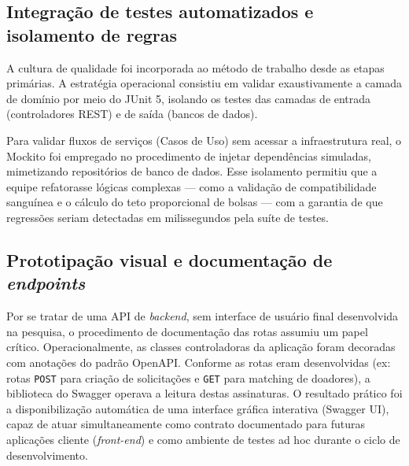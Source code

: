 \subsection{Integração de testes automatizados e isolamento de regras}

A cultura de qualidade foi incorporada ao método de trabalho desde as etapas primárias. A estratégia operacional consistiu em validar exaustivamente a camada de domínio por meio do JUnit 5, isolando os testes das camadas de entrada (controladores REST) e de saída (bancos de dados). 

Para validar fluxos de serviços (Casos de Uso) sem acessar a infraestrutura real, o Mockito foi empregado no procedimento de injetar dependências simuladas, mimetizando repositórios de banco de dados. Esse isolamento permitiu que a equipe refatorasse lógicas complexas --- como a validação de compatibilidade sanguínea e o cálculo do teto proporcional de bolsas --- com a garantia de que regressões seriam detectadas em milissegundos pela suíte de testes.

\subsection{Prototipação visual e documentação de \textit{endpoints}}

Por se tratar de uma API de \textit{backend}, sem interface de usuário final desenvolvida na pesquisa, o procedimento de documentação das rotas assumiu um papel crítico. Operacionalmente, as classes controladoras da aplicação foram decoradas com anotações do padrão OpenAPI. Conforme as rotas eram desenvolvidas (ex: rotas \texttt{POST} para criação de solicitações e \texttt{GET} para matching de doadores), a biblioteca do Swagger operava a leitura destas assinaturas. O resultado prático foi a disponibilização automática de uma interface gráfica interativa (Swagger UI), capaz de atuar simultaneamente como contrato documentado para futuras aplicações cliente (\textit{front-end}) e como ambiente de testes ad hoc durante o ciclo de desenvolvimento.